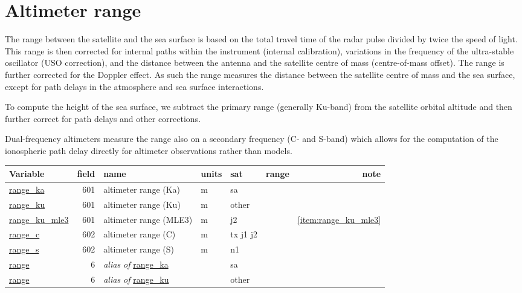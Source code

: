 \documentclass[a4paper,11pt,openany,natbib]{thesis}
\makeatletter
\newcommand\var[1]{\url{#1}\index{variables!#1@\protect\url{#1}}}
\newcommand\alias[1]{\emph{alias of} \var{#1}}
\newenvironment{vartable}{
\begin{table}[ht]
\small
\begin{tabular}{lrllllr}
\hline
Variable & field & name & units & sat & range & note \\
\hline
}{
\hline
\end{tabular}
\end{table}
}
\makeatother
\begin{document}
\section{Altimeter range}
\label{var:range}
The range between the satellite and the sea surface is based on the total travel time of the radar pulse divided by twice the speed of light. This range is then corrected for internal paths within the instrument (internal calibration), variations in the frequency of the ultra-stable oscillator (USO correction), and the distance between the antenna and the satellite centre of mass (centre-of-mass offset). The range is further corrected for the Doppler effect. As such the range measures the distance between the satellite centre of mass and the sea surface, except for path delays in the atmosphere and sea surface interactions.

To compute the height of the sea surface, we subtract the primary range (generally Ku-band) from the satellite orbital altitude and then further correct for path delays and other corrections.

Dual-frequency altimeters measure the range also on a secondary frequency (C- and S-band) which allows for the computation of the ionospheric path delay directly for altimeter observations rather than models.

\begin{vartable}
\var{range_ka} & 601 & altimeter range (Ka) & m & sa & & \\
\var{range_ku} & 601 & altimeter range (Ku) & m & other & & \\
\var{range_ku_mle3} & 601 & altimeter range (MLE3) & m & j2 & & \ref{item:range_ku_mle3} \\
\var{range_c}  & 602 & altimeter range (C) & m & tx j1 j2 & & \\
\var{range_s}  & 602 & altimeter range (S) & m & n1 & & \\
\hline
\var{range} & 6 & \alias{range_ka} & & sa & & \\
\var{range} & 6 & \alias{range_ku} & & other & & \\
\end{vartable}
\end{document}
